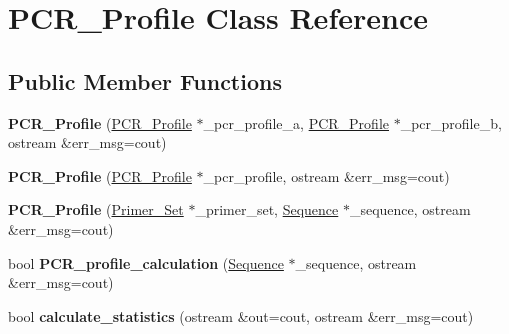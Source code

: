\hypertarget{class_p_c_r___profile}{}\section{P\+C\+R\+\_\+\+Profile Class Reference}
\label{class_p_c_r___profile}
\subsection*{Public Member Functions}
\begin{DoxyCompactItemize}
\item 
\mbox{\label{class_p_c_r___profile_a3b52a78e4b4db8f2c571aaf66bf9a2cc}} 
{\bfseries P\+C\+R\+\_\+\+Profile} (\mbox{\hyperlink{class_p_c_r___profile}{P\+C\+R\+\_\+\+Profile}} $\ast$\+\_\+pcr\+\_\+profile\+\_\+a, \mbox{\hyperlink{class_p_c_r___profile}{P\+C\+R\+\_\+\+Profile}} $\ast$\+\_\+pcr\+\_\+profile\+\_\+b, ostream \&err\+\_\+msg=cout)
\item 
\mbox{\label{class_p_c_r___profile_a4b621dd306d51186d84ac65929f14e7b}} 
{\bfseries P\+C\+R\+\_\+\+Profile} (\mbox{\hyperlink{class_p_c_r___profile}{P\+C\+R\+\_\+\+Profile}} $\ast$\+\_\+pcr\+\_\+profile, ostream \&err\+\_\+msg=cout)
\item 
\mbox{\label{class_p_c_r___profile_a2772873e5a43e8b8c1dde4b6ca9d8a2f}} 
{\bfseries P\+C\+R\+\_\+\+Profile} (\mbox{\hyperlink{class_primer___set}{Primer\+\_\+\+Set}} $\ast$\+\_\+primer\+\_\+set, \mbox{\hyperlink{class_sequence}{Sequence}} $\ast$\+\_\+sequence, ostream \&err\+\_\+msg=cout)
\item 
\mbox{\label{class_p_c_r___profile_a339a01da69e5e709f6b33678bd9f73dc}} 
bool {\bfseries P\+C\+R\+\_\+profile\+\_\+calculation} (\mbox{\hyperlink{class_sequence}{Sequence}} $\ast$\+\_\+sequence, ostream \&err\+\_\+msg=cout)
\item 
\mbox{\label{class_p_c_r___profile_a6f209d643d15a15c7a7b940e18df9497}} 
bool {\bfseries calculate\+\_\+statistics} (ostream \&out=cout, ostream \&err\+\_\+msg=cout)
\item 
\mbox{\label{class_p_c_r___profile_a9897676b415905e30809e69c399a859a}} 

\end{DoxyCompactItemize}
